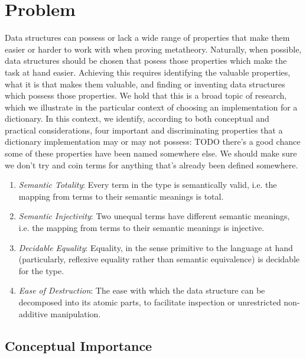 \documentclass[nonacm]{acmart}
\theoremstyle{slplain}
\numberwithin{thm}{section}
\begin{document}
\section{Problem}
\label{sec:Problem}
Data structures can possess or lack a wide range of properties that make them easier or harder to work with
when proving metatheory. Naturally, when possible, data structures should be chosen that posess those
properties which make the task at hand easier. Achieving this requires identifying the valuable properties,
what it is that makes them valuable, and finding or inventing data structures which possess those properties.
We hold that this is a broad topic of
research, which we illustrate in the particular context of choosing an implementation for a dictionary. In
this context, we identify, according to both conceptual and practical considerations, four important and
discriminating properties that a dictionary implementation may or may not possess:
TODO there's a good chance some of these properties have been named somewhere else. We should make sure we
don't try and coin terms for anything that's already been defined somewhere.
\newcommand{\SemTot}{\textit{Semantic Totality}}
\newcommand{\SemInj}{\textit{Semantic Injectivity}}
\newcommand{\EqDec}{\textit{Decidable Equality}}
\newcommand{\EzDstr}{\textit{Ease of Destruction}}
\begin{enumerate}
  \item \SemTot: Every term in the type is semantically valid, i.e. the mapping from
                 terms to their semantic meanings is total.
  \item \SemInj: Two unequal terms have different semantic meanings, i.e. the mapping
                 from terms to their semantic meanings is injective.
  \item \EqDec: Equality, in the sense primitive to the language at hand (particularly,
                reflexive equality rather than semantic equivalence) is decidable for the type.
  \item \EzDstr: The ease with which the data structure can be decomposed into its atomic
                 parts, to facilitate inspection or unrestricted non-additive manipulation.
\end{enumerate}


\subsection{Conceptual Importance}
\label{sec:Problem:concept}
\end{document}
